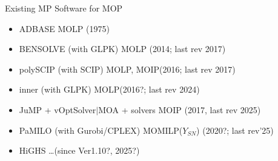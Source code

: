 \documentclass[]{beamer}
\begin{document}
\begin{frame}{Existing MP Software for MOP}

\small{
\begin{itemize}

\item ADBASE \hspace{32mm}MOLP \hfill (1975)\vspace{-1mm}\\
\pause
\item BENSOLVE (with GLPK) \hspace{10mm}MOLP \hfill (2014; last rev 2017)\vspace{-1mm}\\

\item polySCIP (with SCIP) \hspace{13.5mm} MOLP, MOIP\hfill (2016; last rev 2017)\vspace{-1mm}\\

\item inner (with GLPK) \hspace{18.5mm} MOLP\hfill (2016?; last rev 2024)\vspace{-1mm}\\

\item JuMP + vOptSolver$\mid$MOA + solvers \hspace{3mm} MOIP \hfill (2017, last rev 2025)\vspace{-1mm}\\

\item PaMILO (with Gurobi/CPLEX)  \hspace{2mm} MOMILP($Y_{SN}$) \hfill (2020?; last rev'25)\vspace{-1mm}\\
\pause

\item HiGHS \hspace{29.25mm} \dots  \hfill (since Ver1.10?, 2025?)\vspace{-1mm}\\

\end{itemize}




\vspace{3mm}

}
\end{frame}
\end{document}
